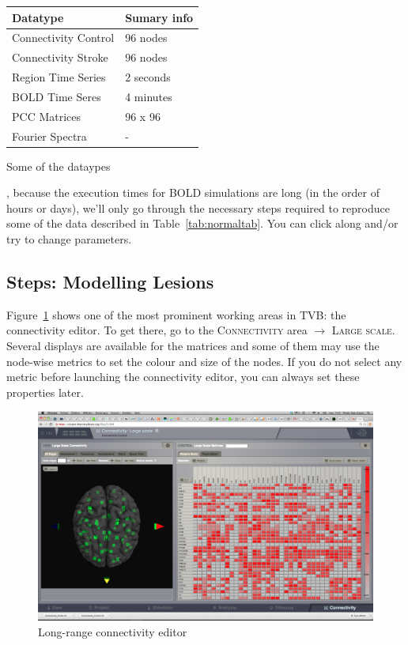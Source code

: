 \documentclass{tufte-handout}
\begin{document}
\begin{margintable}
  \centering
  \selectfont
  \begin{tabular}{ll}
    \toprule
    Datatype & Sumary info                       \\
    \midrule
    Connectivity Control & 96 {nodes}            \\
    Connectivity Stroke  & 96 {nodes}            \\
    Region Time Series   & 2 seconds             \\
    BOLD   Time Seres    & 4 minutes             \\  
    PCC Matrices         & 96 x 96               \\
    Fourier Spectra      &  - \\ 
    \bottomrule
  \end{tabular}
  \caption{Some of the dataypes}
  \label{tab:normaltab}
\end{margintable}


, because the execution times for BOLD simulations
are long (in the order of hours or days), we'll only go through the necessary
steps required to reproduce some of the data described in
Table~\ref{tab:normaltab}. You can click along and/or try to change
parameters.


\subsection{Steps: Modelling Lesions}\label{sec:steps}

Figure~\ref{fig:fig} shows one of the most prominent working areas in
\textsc{TVB}: the connectivity editor. To get there, go to the
\textsc{Connectivity} area $\rightarrow$ \textsc{Large scale}. Several
displays are available for the matrices and some of them may use the node-wise
metrics to set the colour and size of the nodes. If you do not select any
metric before launching the connectivity editor, you can always set these
properties later.

\begin{figure}[h]
  \includegraphics[width=\linewidth]{Handout_UI_ModellingStructuralLesions_ConnectivityArea}%
  \caption{Long-range connectivity editor}%
  \label{fig:fig}%
\end{figure}
\end{document}
